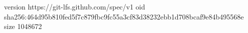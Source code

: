 version https://git-lfs.github.com/spec/v1
oid sha256:464d95b810fed5f7c879fbc9fc55a3cf83d38232ebb1d708bcaf9e84b495568e
size 1048672

